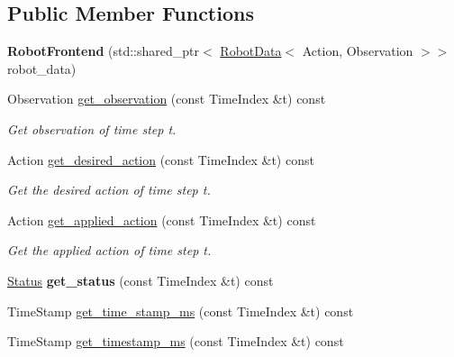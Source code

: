 \subsection*{Public Member Functions}
\begin{DoxyCompactItemize}
\item 
\mbox{\label{classrobot__interfaces_1_1RobotFrontend_a0bd84764fb1a3004282706963aa48c3e}} 
{\bfseries Robot\+Frontend} (std\+::shared\+\_\+ptr$<$ \hyperlink{classrobot__interfaces_1_1RobotData}{Robot\+Data}$<$ Action, Observation $>$$>$ robot\+\_\+data)
\item 
Observation \hyperlink{classrobot__interfaces_1_1RobotFrontend_a95964f3d7aeaab7eec4c9a8782500c0f}{get\+\_\+observation} (const Time\+Index \&t) const
\begin{DoxyCompactList}\small\item\em Get observation of time step t. \end{DoxyCompactList}\item 
Action \hyperlink{classrobot__interfaces_1_1RobotFrontend_a8710ad1f0de000dfb099585e0ac7f140}{get\+\_\+desired\+\_\+action} (const Time\+Index \&t) const
\begin{DoxyCompactList}\small\item\em Get the desired action of time step t. \end{DoxyCompactList}\item 
Action \hyperlink{classrobot__interfaces_1_1RobotFrontend_a870651d849fe0f1a4909820cc3b6de40}{get\+\_\+applied\+\_\+action} (const Time\+Index \&t) const
\begin{DoxyCompactList}\small\item\em Get the applied action of time step t. \end{DoxyCompactList}\item 
\mbox{\label{classrobot__interfaces_1_1RobotFrontend_a080a709a39ff710c2a38bd53ff313645}} 
\hyperlink{structrobot__interfaces_1_1Status}{Status} {\bfseries get\+\_\+status} (const Time\+Index \&t) const
\item 
Time\+Stamp \hyperlink{classrobot__interfaces_1_1RobotFrontend_a68cfe3df122ae9fe5cc6ea15ea867a6e}{get\+\_\+time\+\_\+stamp\+\_\+ms} (const Time\+Index \&t) const
\item 
Time\+Stamp \hyperlink{classrobot__interfaces_1_1RobotFrontend_a6ad481cd306ea4fc2739dc9aba4cb96a}{get\+\_\+timestamp\+\_\+ms} (const Time\+Index \&t) const
$$
\end{DoxyCompactItemize}
